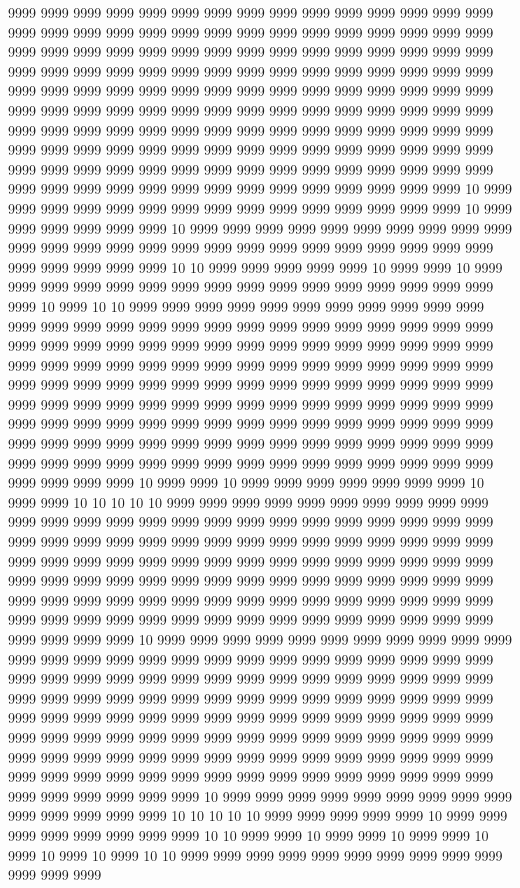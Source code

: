 9999 9999 9999 9999 9999 9999 9999 9999 9999 9999 9999 9999 9999 9999 9999 9999 9999 9999 9999 9999 9999 9999 9999 9999 9999 9999 9999 9999 9999 9999 9999 9999 9999 9999 9999 9999 9999 9999 9999 9999 9999 9999 9999 9999 9999 9999 9999 9999 9999 9999 9999 9999 9999 9999 9999 9999 9999 9999 9999 9999 9999 9999 9999 9999 9999 9999 9999 9999 9999 9999 9999 9999 9999 9999 9999 9999 9999 9999 9999 9999 9999 9999 9999 9999 9999 9999 9999 9999 9999 9999 9999 9999 9999 9999 9999 9999 9999 9999 9999 9999 9999 9999 9999 9999 9999 9999 9999 9999 9999 9999 9999 9999 9999 9999 9999 9999 9999 9999 9999 9999 9999 9999 9999 9999 9999 9999 9999 9999 9999 9999 9999 9999 9999 9999 9999 9999 9999 9999 9999 9999 9999 9999 9999 9999 9999 9999 9999 9999 9999 10 9999 9999 9999 9999 9999 9999 9999 9999 9999 9999 9999 9999 9999 9999 9999 10 9999 9999 9999 9999 9999 9999 10 9999 9999 9999 9999 9999 9999 9999 9999 9999 9999 9999 9999 9999 9999 9999 9999 9999 9999 9999 9999 9999 9999 9999 9999 9999 9999 9999 9999 9999 9999 10 10 9999 9999 9999 9999 9999 10 9999 9999 10 9999 9999 9999 9999 9999 9999 9999 9999 9999 9999 9999 9999 9999 9999 9999 9999 9999 10 9999 10 10 9999 9999 9999 9999 9999 9999 9999 9999 9999 9999 9999 9999 9999 9999 9999 9999 9999 9999 9999 9999 9999 9999 9999 9999 9999 9999 9999 9999 9999 9999 9999 9999 9999 9999 9999 9999 9999 9999 9999 9999 9999 9999 9999 9999 9999 9999 9999 9999 9999 9999 9999 9999 9999 9999 9999 9999 9999 9999 9999 9999 9999 9999 9999 9999 9999 9999 9999 9999 9999 9999 9999 9999 9999 9999 9999 9999 9999 9999 9999 9999 9999 9999 9999 9999 9999 9999 9999 9999 9999 9999 9999 9999 9999 9999 9999 9999 9999 9999 9999 9999 9999 9999 9999 9999 9999 9999 9999 9999 9999 9999 9999 9999 9999 9999 9999 9999 9999 9999 9999 9999 9999 9999 9999 9999 9999 9999 9999 9999 9999 9999 9999 9999 9999 9999 9999 10 9999 9999 10 9999 9999 9999 9999 9999 9999 9999 10 9999 9999 10 10 10 10 10 9999 9999 9999 9999 9999 9999 9999 9999 9999 9999 9999 9999 9999 9999 9999 9999 9999 9999 9999 9999 9999 9999 9999 9999 9999 9999 9999 9999 9999 9999 9999 9999 9999 9999 9999 9999 9999 9999 9999 9999 9999 9999 9999 9999 9999 9999 9999 9999 9999 9999 9999 9999 9999 9999 9999 9999 9999 9999 9999 9999 9999 9999 9999 9999 9999 9999 9999 9999 9999 9999 9999 9999 9999 9999 9999 9999 9999 9999 9999 9999 9999 9999 9999 9999 9999 9999 9999 9999 9999 9999 9999 9999 9999 9999 9999 9999 9999 9999 9999 9999 9999 9999 9999 9999 10 9999 9999 9999 9999 9999 9999 9999 9999 9999 9999 9999 9999 9999 9999 9999 9999 9999 9999 9999 9999 9999 9999 9999 9999 9999 9999 9999 9999 9999 9999 9999 9999 9999 9999 9999 9999 9999 9999 9999 9999 9999 9999 9999 9999 9999 9999 9999 9999 9999 9999 9999 9999 9999 9999 9999 9999 9999 9999 9999 9999 9999 9999 9999 9999 9999 9999 9999 9999 9999 9999 9999 9999 9999 9999 9999 9999 9999 9999 9999 9999 9999 9999 9999 9999 9999 9999 9999 9999 9999 9999 9999 9999 9999 9999 9999 9999 9999 9999 9999 9999 9999 9999 9999 9999 9999 9999 9999 9999 9999 9999 9999 9999 9999 9999 9999 9999 9999 9999 9999 9999 9999 9999 10 9999 9999 9999 9999 9999 9999 9999 9999 9999 9999 9999 9999 9999 9999 10 10 10 10 10 9999 9999 9999 9999 9999 10 9999 9999 9999 9999 9999 9999 9999 9999 10 10 9999 9999 10 9999 9999 10 9999 9999 10 9999 10 9999 10 9999 10 10 9999 9999 9999 9999 9999 9999 9999 9999 9999 9999 9999 9999 9999 